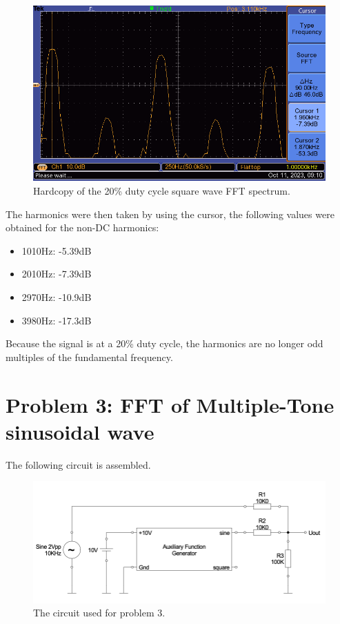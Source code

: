 \begin{enumerate}
\begin{figure}[H]
              \includegraphics[width=0.75\linewidth]{images/problem2_hardcopy6.png}
              \caption{Hardcopy of the 20\% duty cycle square wave FFT spectrum.}
              \label{fig:problem2_hardcopy7}
          \end{figure}
          The harmonics were then taken by using the cursor, the following values were obtained for the non-DC harmonics:
          \begin{itemize}
              \item 1010Hz: -5.39dB
              \item 2010Hz: -7.39dB
              \item 2970Hz: -10.9dB
              \item 3980Hz: -17.3dB
          \end{itemize}
          Because the signal is at a 20\% duty cycle, the harmonics are no longer odd multiples of the fundamental frequency.
\end{enumerate}

\newpage
\section{Problem 3: FFT of Multiple-Tone sinusoidal wave}
The following circuit is assembled.
\begin{figure}[H]
    \centering
    \includegraphics[width=0.75\linewidth]{images/problem3_circuit.png}
    \caption{The circuit used for problem 3.}
    \label{fig:problem3_circuit}
\end{figure}


